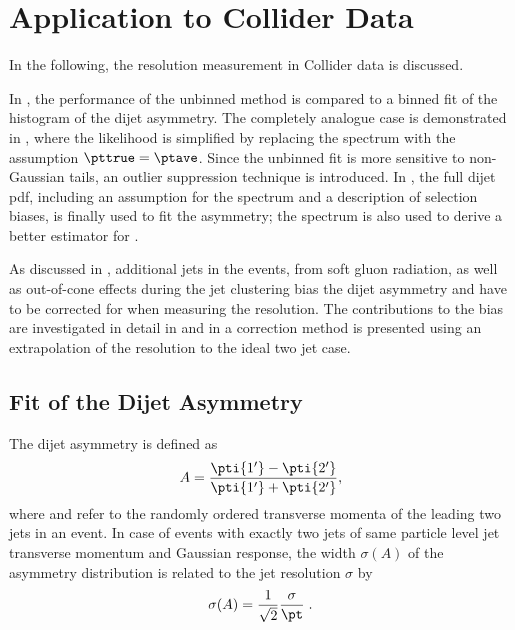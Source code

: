 \section{Application to Collider Data}\label{sec:ResFit:DataDriven}

In the following, the resolution measurement in Collider data is
discussed.

In , the performance of the unbinned
method is compared to a binned fit of the histogram of the dijet asymmetry.
The completely analogue case is demonstrated in
, where the likelihood is simplified by replacing the spectrum
with the assumption \mbox{$\pttrue = \ptave$}.
Since the unbinned fit is more sensitive to non-Gaussian tails, an outlier
suppression technique is introduced.
In , the full dijet pdf, including an assumption for the
spectrum and a description of selection biases, is finally used to fit the asymmetry;
the spectrum is also used to derive a better estimator for \ptgen.

As discussed in , additional jets in the events, \eg from soft gluon radiation, as
well as out-of-cone effects during the jet clustering bias the dijet asymmetry and have to be
corrected for when measuring the resolution.
The contributions to the bias are investigated in detail in  and
in  a correction method is presented using an extrapolation of
the resolution to the ideal two jet case.


\subsection{Fit of the Dijet Asymmetry}\label{sec:ResFit:DataDriven:Asym}

The dijet asymmetry is defined as
\begin{equation}\label{eq:ResFit:Asymmetry}
  A = \frac{\pti{1'}-\pti{2'}}{\pti{1'}+\pti{2'}},
\end{equation}
where  and  refer to the randomly ordered transverse momenta of the
leading two jets in an event.
In case of events with exactly two jets of same particle level jet
transverse momentum \pt and Gaussian response, the width $\sigma(A)$ of the asymmetry distribution is
related to the jet \pt resolution $\sigma$ by
\begin{equation}
  \label{eq:ResFit:ResFromAsym}
  \sigma(A) = \frac{1}{\sqrt{2}}\frac{\sigma}{\pt} \; .
\end{equation}


